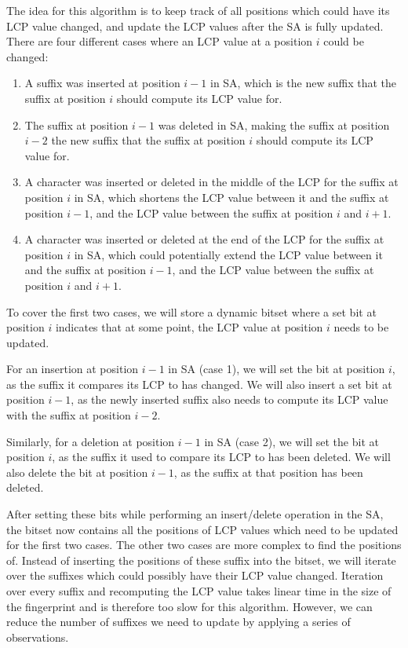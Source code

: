 The idea for this algorithm is to keep track of all positions which could have its LCP
value changed, and update the LCP values after the SA is fully updated. There are four
different cases where an LCP value at a position $i$ could be changed:

\begin{enumerate}
    \item A suffix was inserted at position $i - 1$ in SA, which is the new suffix that
        the suffix at position $i$ should compute its LCP value for.

    \item The suffix at position $i - 1$ was deleted in SA, making the suffix at position
        $i - 2$ the new suffix that the suffix at position $i$ should compute its LCP
        value for.

    \item A character was inserted or deleted in the middle of the LCP for the suffix at
        position $i$ in SA, which shortens the LCP value between it and the suffix at
        position $i - 1$, and the LCP value between the suffix at position $i$ and $i + 1$.

    \item A character was inserted or deleted at the end of the LCP for the suffix at
        position $i$ in SA, which could potentially extend the LCP value between it and
        the suffix at position $i - 1$, and the LCP value between the suffix at position
        $i$ and $i + 1$.

\end{enumerate}

To cover the first two cases, we will store a dynamic bitset where a set bit at position
$i$ indicates that at some point, the LCP value at position $i$ needs to be updated.

For an insertion at position $i - 1$ in SA (case 1), we will set the bit at position $i$,
as the suffix it compares its LCP to has changed. We will also insert a set bit at
position $i - 1$, as the newly inserted suffix also needs to compute its LCP value with
the suffix at position $i - 2$.

Similarly, for a deletion at position $i - 1$ in SA (case 2), we will set the bit at
position $i$, as the suffix it used to compare its LCP to has been deleted. We will also
delete the bit at position $i - 1$, as the suffix at that position has been deleted.

After setting these bits while performing an insert/delete operation in the SA, the bitset
now contains all the positions of LCP values which need to be updated for the first two
cases. The other two cases are more complex to find the positions of. Instead of inserting
the positions of these suffix into the bitset, we will iterate over the suffixes which
could possibly have their LCP value changed. Iteration over every suffix and recomputing
the LCP value takes linear time in the size of the fingerprint and is therefore too slow
for this algorithm. However, we can reduce the number of suffixes we need to update by
applying a series of observations.

